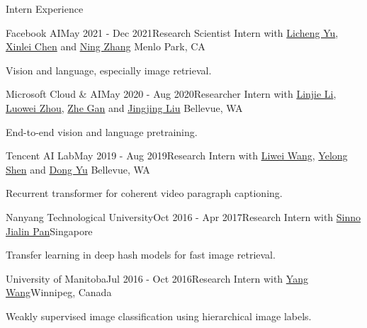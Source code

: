 \documentclass{resume} %
\begin{document}
\begin{rSection}{Intern Experience}


\begin{rSubsection}{Facebook AI}{May 2021 - Dec 2021}{Research Scientist Intern with
    \href{https://lichengunc.github.io/}{Licheng Yu},
    \href{http://xinleic.xyz/}{Xinlei Chen} and \href{https://scholar.google.com/citations?user=DplAah0AAAAJ&hl=en}{Ning Zhang}} {Menlo Park, CA}
    \item Vision and language, especially image retrieval.
    \end{rSubsection}



\begin{rSubsection}{Microsoft Cloud \& AI}{May 2020 - Aug 2020}{Researcher Intern with
    \href{https://scholar.google.com/citations?user=WR875gYAAAAJ&hl=en}{Linjie Li},
    \href{https://luoweizhou.github.io/}{Luowei Zhou}, \href{http://zhegan27.github.io/}{Zhe Gan} and
    \href{https://www.linkedin.com/in/jingjing-liu-65703431/}{Jingjing Liu}} {Bellevue, WA}
    \item End-to-end vision and language pretraining.
    \end{rSubsection}



\begin{rSubsection}{Tencent AI Lab}{May 2019 - Aug 2019}{Research Intern with
    \href{http://www.deepcv.net/}{Liwei Wang},
    \href{https://scholar.google.com/citations?hl=en&user=S6OFEFEAAAAJ}{Yelong Shen}
    and \href{https://scholar.google.com/citations?user=tMY31_gAAAAJ&hl=en}{Dong Yu}} {Bellevue, WA}
    \item Recurrent transformer for coherent video paragraph captioning.
    \end{rSubsection}


\begin{rSubsection}{Nanyang Technological University}{Oct 2016 - Apr 2017}{Research Intern with \href{https://personal.ntu.edu.sg/sinnopan/}{Sinno Jialin Pan}}{Singapore}
    \item Transfer learning in deep hash models for fast image retrieval.
    \end{rSubsection}


\begin{rSubsection}{University of Manitoba}{Jul 2016 - Oct 2016}{Research Intern with \href{https://www.cs.umanitoba.ca/~ywang/}{Yang Wang}}{Winnipeg, Canada}
    \item Weakly supervised image classification using hierarchical image labels.
    \end{rSubsection}

\end{rSection}
\end{document}
